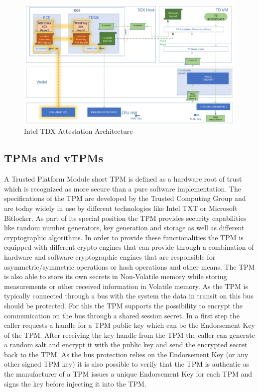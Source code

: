 \documentclass[sigplan,screen,nonacm]{acmart}
\begin{document}
\begin{figure}
  \centering
  \includegraphics[width=\linewidth]{pictures/Enclaves.png}
  \caption{Intel TDX Attestation Architecture \cite{Intel-QVL}}
  \label{fig:tdxattest}
\end{figure}


\subsection{TPMs and vTPMs}
\label{chap:TPM}
A Trusted Platform Module short TPM is defined as a hardware root of trust which is recognized as more secure than a pure software implementation\cite[p.1]{TPM}.
The specifications of the TPM are developed by the Trusted Computing Group and are today widely in use by different technologies like Intel TXT\cite[p.15]{Intel-TXT} or Microsoft Bitlocker\cite{Bitlocker}.
As part of its special position the TPM provides security capabilities like random number generators, key generation and storage as well as different cryptographic algorithms.
In order to provide these functionalities the TPM is equipped with different crypto engines that can provide through a combination of hardware and software cryptographic engines that are responsible for asymmetric/symmetric operations or hash operations and other means\cite[p. 69]{TPM-Arch}.
The TPM is also able to store its own secrets in Non-Volatile memory while storing measurements or other received information in Volatile memory\cite[p. 69]{TPM-Arch}.
As the TPM is typically connected through a bus with the system the data in transit on this bus should be protected.
For this the TPM supports the possibility to encrypt the communication on the bus through a shared session secret\cite[p. 11]{TPM-Mitigation}.
In a first step the caller requests a handle for a TPM public key which can be the Endorsement Key of the TPM.
After receiving the key handle from the TPM the caller can generate a random salt and encrypt it with the public key and send the encrypted secret back to the TPM\cite[p. 13]{TPM-Mitigation}.
As the bus protection relies on the Endorsement Key (or any other signed TPM key) it is also possible to verify that the TPM is authentic as the manufacturer of a TPM issues a unique Endorsement Key for each TPM and signs the key before injecting it into the TPM.
\end{document}

